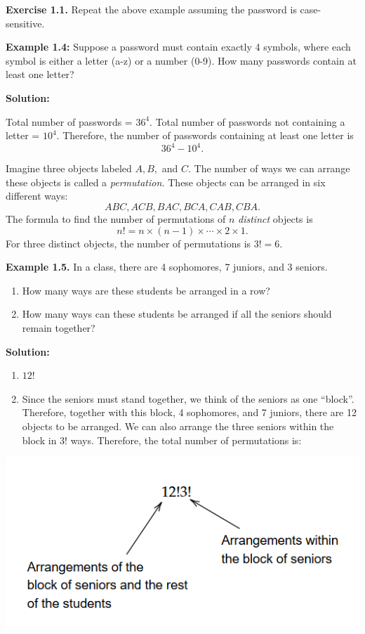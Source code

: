 \documentclass[
  12pt,
]{krantzNoCorner}
\providecommand{\tightlist}{%
  \setlength{\itemsep}{0pt}\setlength{\parskip}{0pt}}
\begin{document}
\textbf{Exercise 1.1.} Repeat the above example assuming the password is
case-sensitive.

\textbf{Example 1.4:} Suppose a password must contain exactly 4 symbols,
where each symbol is either a letter (a-z) or a number (0-9). How many
passwords contain at least one letter?

\textbf{Solution:}

Total number of passwords = \(36^4\). Total number of passwords not
containing a letter = \(10^4\). Therefore, the number of passwords
containing at least one letter is \[36^4-10^4.\]

Imagine three objects labeled \(A,B,\) and \(C.\) The number of ways we can
arrange these objects is called a \emph{permutation.} These objects can be
arranged in six different ways: \[ABC, ACB, BAC, BCA, CAB, CBA.\] The
formula to find the number of permutations of \(n\) \emph{distinct} objects is
\[n!=n\times (n-1)\times\cdots\times 2\times 1.\] For three distinct
objects, the number of permutations is \(3!=6.\)

\textbf{Example 1.5.} In a class, there are 4 sophomores, 7 juniors, and 3
seniors.

\begin{enumerate}
\def\labelenumi{\arabic{enumi}.}
\tightlist
\item
  How many ways are these students be arranged in a row?
\item
  How many ways can these students be arranged if all the seniors
  should remain together?
\end{enumerate}

\textbf{Solution:}

\begin{enumerate}
\def\labelenumi{\arabic{enumi}.}
\tightlist
\item
  \(12!\)
\item
  Since the seniors must stand together, we think of the seniors as
  one ``block''. Therefore, together with this block, 4 sophomores,
  and 7 juniors, there are 12 objects to be arranged. We can also
  arrange the three seniors within the block in \(3!\) ways. Therefore,
  the total number of permutations is:
\end{enumerate}

\includegraphics[width=0.8\linewidth,height=0.5\textheight]{class_example_permutations}
\end{document}
